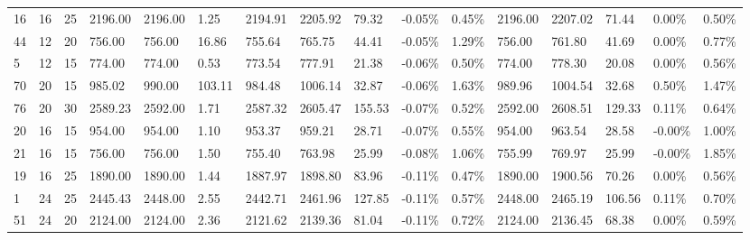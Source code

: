 \documentclass[../main]{subfiles}
\begin{document}
\begin{longtable}{l|ll|lll|lllll|lllll}
   16 & 16                         & 25                         & 2196.00                   & 2196.00     & 1.25                & 2194.91 & 2205.92 & 79.32  & -0.05\% & 0.45\% & 2196.00 & 2207.02 & 71.44  & 0.00\%  & 0.50\% \\
   44 & 12                         & 20                         & 756.00                    & 756.00      & 16.86               & 755.64  & 765.75  & 44.41  & -0.05\% & 1.29\% & 756.00  & 761.80  & 41.69  & 0.00\%  & 0.77\% \\
   5  & 12                         & 15                         & 774.00                    & 774.00      & 0.53                & 773.54  & 777.91  & 21.38  & -0.06\% & 0.50\% & 774.00  & 778.30  & 20.08  & 0.00\%  & 0.56\% \\
   70 & 20                         & 15                         & 985.02                    & 990.00      & 103.11              & 984.48  & 1006.14 & 32.87  & -0.06\% & 1.63\% & 989.96  & 1004.54 & 32.68  & 0.50\%  & 1.47\% \\
   76 & 20                         & 30                         & 2589.23                   & 2592.00     & 1.71                & 2587.32 & 2605.47 & 155.53 & -0.07\% & 0.52\% & 2592.00 & 2608.51 & 129.33 & 0.11\%  & 0.64\% \\
   20 & 16                         & 15                         & 954.00                    & 954.00      & 1.10                & 953.37  & 959.21  & 28.71  & -0.07\% & 0.55\% & 954.00  & 963.54  & 28.58  & -0.00\% & 1.00\% \\
   21 & 16                         & 15                         & 756.00                    & 756.00      & 1.50                & 755.40  & 763.98  & 25.99  & -0.08\% & 1.06\% & 755.99  & 769.97  & 25.99  & -0.00\% & 1.85\% \\
   19 & 16                         & 25                         & 1890.00                   & 1890.00     & 1.44                & 1887.97 & 1898.80 & 83.96  & -0.11\% & 0.47\% & 1890.00 & 1900.56 & 70.26  & 0.00\%  & 0.56\% \\
   1  & 24                         & 25                         & 2445.43                   & 2448.00     & 2.55                & 2442.71 & 2461.96 & 127.85 & -0.11\% & 0.57\% & 2448.00 & 2465.19 & 106.56 & 0.11\%  & 0.70\% \\
   51 & 24                         & 20                         & 2124.00                   & 2124.00     & 2.36                & 2121.62 & 2139.36 & 81.04  & -0.11\% & 0.72\% & 2124.00 & 2136.45 & 68.38  & 0.00\%  & 0.59\% \\

\end{longtable}
\end{document}
